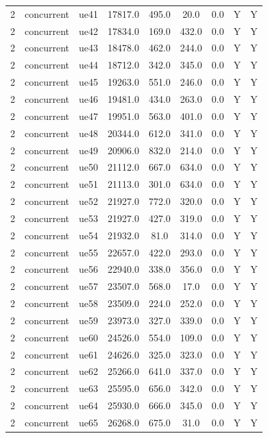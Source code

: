 \begin{table}[ht]
\begin{tabular}{|c|c|c|c|c|c|c|c|c|}
2 & concurrent & ue41 & 17817.0 & 495.0 & 20.0 & 0.0 & Y & Y \\
2 & concurrent & ue42 & 17834.0 & 169.0 & 432.0 & 0.0 & Y & Y \\
2 & concurrent & ue43 & 18478.0 & 462.0 & 244.0 & 0.0 & Y & Y \\
2 & concurrent & ue44 & 18712.0 & 342.0 & 345.0 & 0.0 & Y & Y \\
2 & concurrent & ue45 & 19263.0 & 551.0 & 246.0 & 0.0 & Y & Y \\
2 & concurrent & ue46 & 19481.0 & 434.0 & 263.0 & 0.0 & Y & Y \\
2 & concurrent & ue47 & 19951.0 & 563.0 & 401.0 & 0.0 & Y & Y \\
2 & concurrent & ue48 & 20344.0 & 612.0 & 341.0 & 0.0 & Y & Y \\
2 & concurrent & ue49 & 20906.0 & 832.0 & 214.0 & 0.0 & Y & Y \\
2 & concurrent & ue50 & 21112.0 & 667.0 & 634.0 & 0.0 & Y & Y \\
2 & concurrent & ue51 & 21113.0 & 301.0 & 634.0 & 0.0 & Y & Y \\
2 & concurrent & ue52 & 21927.0 & 772.0 & 320.0 & 0.0 & Y & Y \\
2 & concurrent & ue53 & 21927.0 & 427.0 & 319.0 & 0.0 & Y & Y \\
2 & concurrent & ue54 & 21932.0 & 81.0 & 314.0 & 0.0 & Y & Y \\
2 & concurrent & ue55 & 22657.0 & 422.0 & 293.0 & 0.0 & Y & Y \\
2 & concurrent & ue56 & 22940.0 & 338.0 & 356.0 & 0.0 & Y & Y \\
2 & concurrent & ue57 & 23507.0 & 568.0 & 17.0 & 0.0 & Y & Y \\
2 & concurrent & ue58 & 23509.0 & 224.0 & 252.0 & 0.0 & Y & Y \\
2 & concurrent & ue59 & 23973.0 & 327.0 & 339.0 & 0.0 & Y & Y \\
2 & concurrent & ue60 & 24526.0 & 554.0 & 109.0 & 0.0 & Y & Y \\
2 & concurrent & ue61 & 24626.0 & 325.0 & 323.0 & 0.0 & Y & Y \\
2 & concurrent & ue62 & 25266.0 & 641.0 & 337.0 & 0.0 & Y & Y \\
2 & concurrent & ue63 & 25595.0 & 656.0 & 342.0 & 0.0 & Y & Y \\
2 & concurrent & ue64 & 25930.0 & 666.0 & 345.0 & 0.0 & Y & Y \\
2 & concurrent & ue65 & 26268.0 & 675.0 & 31.0 & 0.0 & Y & Y \\

\end{tabular}
\end{table}
